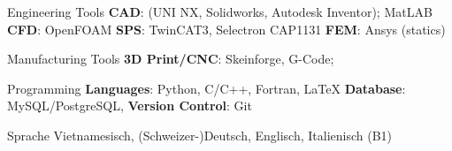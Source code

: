 

\begin{cvskills}


  \cvskill
    {Engineering Tools} %
    {\textbf{CAD}: (UNI NX, Solidworks, Autodesk Inventor); MatLAB
    \newline \textbf{CFD}: OpenFOAM
    \newline \textbf{SPS}: TwinCAT3, Selectron CAP1131
	\newline \textbf{FEM}: Ansys (statics)\smallskip} %


  \cvskill
    {Manufacturing Tools} %
    {\textbf{3D Print/CNC}: Skeinforge, G-Code;} %

  \cvskill
    {Programming} %
    {\textbf{Languages}: Python, C/C++, Fortran, LaTeX 
    	\newline \textbf{Database}: MySQL/PostgreSQL,
    	\newline \textbf{Version Control}: Git
    	\newline} %


  \cvskill
    {Sprache} %
    {Vietnamesisch, (Schweizer-)Deutsch, Englisch, Italienisch (B1)} %

\end{cvskills}
